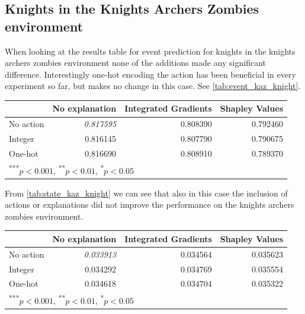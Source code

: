 \documentclass[UKenglish]{uiomasterthesis}
\begin{document}
\subsection{Knights in the Knights Archers Zombies environment}

When looking at the results table for event prediction for knights in the knights archers zombies environment none of the additions made any significant difference. Interestingly one-hot encoding the action has been beneficial in every experiment so far, but makes no change in this case. See \cref{tab:event_kaz_knight}.

\begin{center}
\label{tab:event_kaz_knight}
\begin{tabular}{lrrr}
\toprule
 & No explanation & Integrated Gradients & Shapley Values \\
\midrule
No action & \textit{0.817595} & 0.808390 & 0.792460 \\
Integer & 0.816145 & 0.807790 & 0.790675 \\
One-hot & 0.816690 & 0.808910 & 0.789370 \\ 
\bottomrule
\multicolumn{3}{l}{\textsuperscript{***}$p<0.001$, 
  \textsuperscript{**}$p<0.01$, 
  \textsuperscript{*}$p<0.05$}
\end{tabular}
\end{center}

From \cref{tab:state_kaz_knight} we can see that also in this case the inclusion of actions or explanations did not improve the performance on the knights archers zombies environment.

\begin{center}
\label{tab:state_kaz_knight}
\begin{tabular}{lrrr}
\toprule
 & No explanation & Integrated Gradients & Shapley Values \\
\midrule
No action & \textit{0.033913} & 0.034564 & 0.035623 \\
Integer & 0.034292 & 0.034769 & 0.035554 \\
One-hot & 0.034618 & 0.034704 & 0.035322 \\
\bottomrule
\multicolumn{3}{l}{\textsuperscript{***}$p<0.001$, 
  \textsuperscript{**}$p<0.01$, 
  \textsuperscript{*}$p<0.05$}
\end{tabular}
\end{center}
\end{document}
